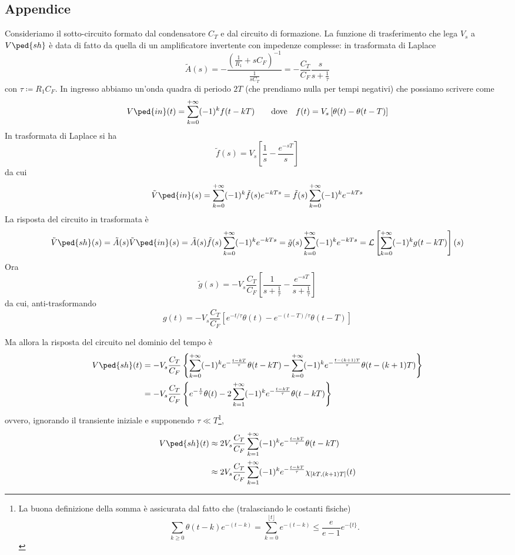 \documentclass[10pt, a4paper, italian]{article}
\begin{document}
\subsection*{Appendice}
Consideriamo il sotto-circuito formato dal condensatore $C_T$ e dal circuito
di formazione. La funzione di trasferimento che lega $V_s$ a $V\ped{sh}$ è
data di fatto da quella di un amplificatore invertente con impedenze
complesse: in trasformata di Laplace
\[
\tilde{A}(s) = - \frac{\left(\frac{1}{R_1} + s 
C_F\right)^{-1}}{\frac{1}{s C_T}} = - \frac{C_T}{C_F} 
\frac{s}{s + \frac{1}{\tau}}
\]
con $ \tau \coloneqq R_1 C_F $. In ingresso abbiamo un'onda quadra di 
periodo $ 2T $ (che prendiamo nulla per tempi negativi) che possiamo scrivere 
come
\[
V\ped{in}(t) = \sum_{k=0}^{+\infty} (-1)^{k}f(t - kT)
\qquad \text{dove} \quad
f(t) = V_s \left[\theta(t) - \theta(t - T)\right]
\]
In trasformata di Laplace si ha
\[
\tilde{f}(s) = V_s\left[\frac{1}{s} - \frac{e^{-sT}}{s}\right]
\]
da cui
\[
\tilde{V}\ped{in}(s) = \sum_{k=0}^{+\infty} (-1)^{k} \tilde{f}(s) e^{-kTs} = 
\tilde{f}(s) \sum_{k=0}^{+\infty} (-1)^{k} e^{-kTs}
\]
La risposta del circuito in trasformata è
\[
  \tilde{V}\ped{sh}(s) = \tilde{A}(s) \tilde{V}\ped{in}(s) =  
\tilde{A}(s)\tilde{f}(s) \sum_{k=0}^{+\infty} (-1)^{k}e^{-kTs} = \tilde{g}(s) 
\sum_{k=0}^{+\infty} (-1)^{k}e^{-kTs} = \mathcal{L}\left[\sum_{k=0}^{+\infty} 
(-1)^{k}g(t - kT)\right](s)
\]
Ora
\[
  \tilde{g}(s) = - V_s \frac{C_T}{C_F} \left[\frac{1}{s + 
\frac{1}{\tau}} - \frac{e^{-sT}}{s + \frac{1}{\tau}}\right]
\]
da cui, anti-trasformando
\[
  g(t) = - V_s \frac{C_T}{C_F} \left[e^{-t/\tau}\theta(t) - 
e^{-(t-T)/\tau} \theta(t - T) \right]
\]

Ma allora la risposta del circuito nel dominio del tempo è
\begin{align*}
  V\ped{sh}(t) &= - V_s \frac{C_T}{C_F} \left\{ 
\sum_{k=0}^{+\infty} (-1)^{k}e^{-\frac{t - kT}{\tau}}\theta(t - kT) - 
\sum_{k=0}^{+\infty} (-1)^{k} e^{-\frac{t- (k+1) T }{\tau}} \theta(t - (k+1)T ) 
\right\} \\
               &= - V_s \frac{C_T}{C_F} \left\{ e^{-\frac{t}{\tau}} 
\theta(t) - 2 \sum_{k=1}^{+\infty} (-1)^{k} e^{-\frac{t - kT}{\tau}} \theta(t - 
kT) \right\}
\end{align*}
ovvero, ignorando il transiente iniziale e supponendo $ \tau\ll T $\footnote{
La buona definizione della somma è assicurata dal fatto che (tralasciando le 
costanti fisiche)
\[ \sum_{k \geq 0} \theta(t-k) e^{-(t-k)} = \sum_{k=0}^{\lfloor t \rfloor} 
e^{-(t-k)} \leq \frac{e}{e-1} e^{-\{t\}}. \]
},
\begin{align}\label{eq:Vshaper}
V\ped{sh}(t) &\approx 2 V_s \frac{C_T}{C_F} \sum_{k=1}^{+\infty} 
(-1)^{k} e^{-\frac{t - kT}{\tau}} \theta(t - kT) \nonumber\\
               &\approx  2 V_s \frac{C_T}{C_F} \sum_{k=1}^{+\infty} 
(-1)^{k} e^{-\frac{t - kT}{\tau}} \chi_{[kT, (k+1)T]}(t)
\end{align}
\end{document}
